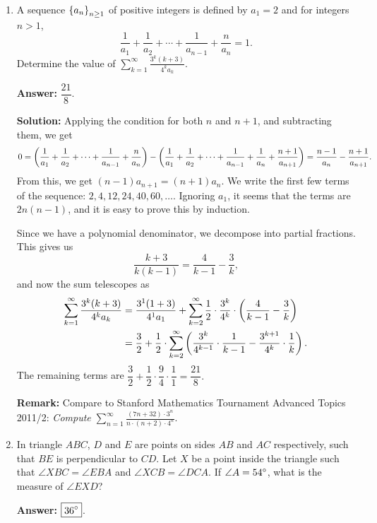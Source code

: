 \documentclass[11pt,paper=letter]{scrartcl}
\begin{document}
\begin{enumerate}[left=0pt]
\item A sequence $\left\{ a_n \right\}_{n \ge 1}$ of positive integers is defined by $a_1 = 2$ and for integers $n > 1$, $$\frac1{a_1} + \frac1{a_2} + \cdots + \frac1{a_{n-1}} + \frac n{a_n} = 1.$$ Determine the value of $\displaystyle \sum_{k=1}^{\infty} \frac{3^k(k+3)}{4^ka_k}$.

\textbf{Answer:} $\boxed{\dfrac{21}{8}}$.

\textbf{Solution:} Applying the condition for both $n$ and $n+1$, and subtracting them, we get $$0 = \left( \frac1{a_1} + \frac1{a_2} + \cdots + \frac1{a_{n-1}} + \frac n{a_n} \right) - \left( \frac1{a_1} + \frac1{a_2} + \cdots + \frac1{a_{n-1}} + \frac 1{a_n} + \frac{n+1}{a_{n+1}} \right) = \frac{n-1}{a_n} - \frac{n+1}{a_{n+1}}.$$ From this, we get $(n-1)a_{n+1} = (n+1)a_n$. We write the first few terms of the sequence: $2, 4, 12, 24, 40, 60, \dots$. Ignoring $a_1$, it seems that the terms are $2n(n-1)$, and it is easy to prove this by induction.

Since we have a polynomial denominator, we decompose into partial fractions. This gives us $$\frac{k+3}{k(k-1)} = \frac4{k-1} - \frac3k,$$ and now the sum telescopes as \begin{align*}
\sum_{k=1}^{\infty} \frac{3^k(k+3)}{4^ka_k} &= \frac{3^1(1+3)}{4^1a_1} + \sum_{k=2}^{\infty} \frac12 \cdot \frac{3^k}{4^k} \cdot \left( \frac4{k-1} - \frac3k \right) \\
&= \frac32 + \frac12 \cdot \sum_{k=2}^{\infty} \left( \frac{3^k}{4^{k-1}} \cdot \frac1{k-1} - \frac{3^{k+1}}{4^{k}}\cdot \frac1k \right).
\end{align*}
The remaining terms are $\dfrac32 + \dfrac12 \cdot \dfrac9{4} \cdot \dfrac11 = \dfrac{21}{8}.$

\textbf{Remark:} Compare to Stanford Mathematics Tournament Advanced Topics 2011/2: \emph{Compute $\displaystyle \sum_{n=1}^{\infty} \frac{(7n+32) \cdot 3^n}{n \cdot (n+2) \cdot 4^n}.$}

\item In triangle $ABC$, $D$ and $E$ are points on sides $AB$ and $AC$ respectively, such that $BE$ is perpendicular to $CD$. Let $X$ be a point inside the triangle such that $\angle XBC = \angle EBA$ and $\angle XCB = \angle DCA$. If $\angle A = 54^\circ$, what is the measure of $\angle EXD$?

\textbf{Answer:} $\boxed{36^\circ}$.


\end{enumerate}
\end{document}
